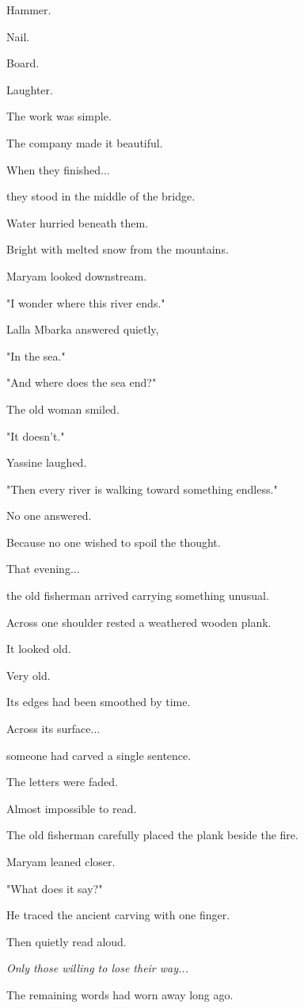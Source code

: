 \documentclass[12pt,openany]{book}
\begin{document}
Hammer.

Nail.

Board.

Laughter.

The work was simple.

The company made it beautiful.

When they finished...

they stood in the middle of the bridge.

Water hurried beneath them.

Bright with melted snow from the mountains.

Maryam looked downstream.

"I wonder where this river ends."

Lalla Mbarka answered quietly,

"In the sea."

"And where does the sea end?"

The old woman smiled.

"It doesn't."

Yassine laughed.

"Then every river is walking toward something endless."

No one answered.

Because no one wished to spoil the thought.

That evening...

the old fisherman arrived carrying something unusual.

Across one shoulder rested a weathered wooden plank.

It looked old.

Very old.

Its edges had been smoothed by time.

Across its surface...

someone had carved a single sentence.

The letters were faded.

Almost impossible to read.

The old fisherman carefully placed the plank beside the fire.

Maryam leaned closer.

"What does it say?"

He traced the ancient carving with one finger.

Then quietly read aloud.

\emph{Only those willing to lose their way...}

The remaining words had worn away long ago.
\end{document}
